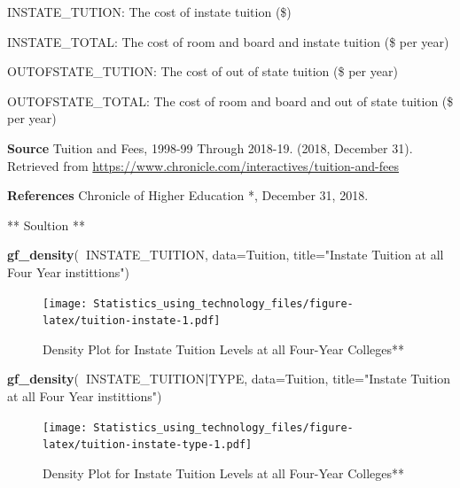 \documentclass[
]{book}
\newenvironment{Shaded}{\begin{snugshade}}{\end{snugshade}}
\newcommand{\DataTypeTok}[1]{\textcolor[rgb]{0.13,0.29,0.53}{#1}}
\newcommand{\KeywordTok}[1]{\textcolor[rgb]{0.13,0.29,0.53}{\textbf{#1}}}
\newcommand{\NormalTok}[1]{#1}
\newcommand{\OperatorTok}[1]{\textcolor[rgb]{0.81,0.36,0.00}{\textbf{#1}}}
\newcommand{\StringTok}[1]{\textcolor[rgb]{0.31,0.60,0.02}{#1}}
\begin{document}
INSTATE\_TUTION: The cost of instate tuition (\$)

INSTATE\_TOTAL: The cost of room and board and instate tuition (\$ per year)

OUTOFSTATE\_TUTION: The cost of out of state tuition (\$ per year)

OUTOFSTATE\_TOTAL: The cost of room and board and out of state tuition (\$ per year)

\textbf{Source}
Tuition and Fees, 1998-99 Through 2018-19. (2018, December 31). Retrieved from \url{https://www.chronicle.com/interactives/tuition-and-fees}

\textbf{References}
Chronicle of Higher Education *, December 31, 2018.

** Soultion **



\begin{Shaded}
\begin{Highlighting}[]
\KeywordTok{gf_density}\NormalTok{(}\OperatorTok{~}\NormalTok{INSTATE_TUITION, }\DataTypeTok{data=}\NormalTok{Tuition, }\DataTypeTok{title=}\StringTok{"Instate Tuition at all Four Year instittions"}\NormalTok{)}
\end{Highlighting}
\end{Shaded}

\begin{figure}
\centering
\texttt{[image: Statistics\_using\_technology\_files/figure-latex/tuition-instate-1.pdf]}
\caption{\label{fig:tuition-instate}Density Plot for Instate Tuition Levels at all Four-Year Colleges**}
\end{figure}



\begin{Shaded}
\begin{Highlighting}[]
\KeywordTok{gf_density}\NormalTok{(}\OperatorTok{~}\NormalTok{INSTATE_TUITION}\OperatorTok{|}\NormalTok{TYPE, }\DataTypeTok{data=}\NormalTok{Tuition, }\DataTypeTok{title=}\StringTok{"Instate Tuition at all Four Year instittions"}\NormalTok{)}
\end{Highlighting}
\end{Shaded}

\begin{figure}
\centering
\texttt{[image: Statistics\_using\_technology\_files/figure-latex/tuition-instate-type-1.pdf]}
\caption{\label{fig:tuition-instate-type}Density Plot for Instate Tuition Levels at all Four-Year Colleges**}
\end{figure}
\end{document}
